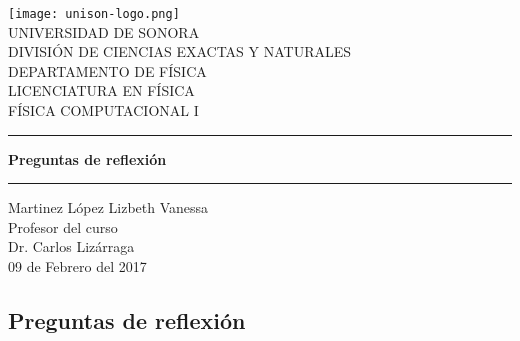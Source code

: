 \documentclass[12 pt]{article}
\begin{document}
\begin{center}
\texttt{[image: unison-logo.png]}
\\
\vspace{0.5cm}
UNIVERSIDAD DE SONORA \\
\vspace{0.5cm}
DIVISIÓN DE CIENCIAS EXACTAS Y NATURALES \\
\vspace{0.5cm}
DEPARTAMENTO DE FÍSICA\\
\vspace{0.5cm}
LICENCIATURA EN FÍSICA\\
\vspace{0.5cm}
FÍSICA COMPUTACIONAL I

\vspace{2 cm}
\hrule
\vspace{1 cm}

{\huge \bfseries {Preguntas de reflexión}}
\\

\vspace{1 cm}
\hrule
\vspace{2 cm}
Martinez López Lizbeth Vanessa \\ 
\vspace{1 cm}
Profesor del curso\\
Dr. Carlos Lizárraga\\
\vspace{2 cm}
09 de Febrero del 2017
\end{center}
\pagebreak

\begin{center}
\section*{Preguntas de reflexión}
\end{center}
\vspace{1 cm}
\end{document}

